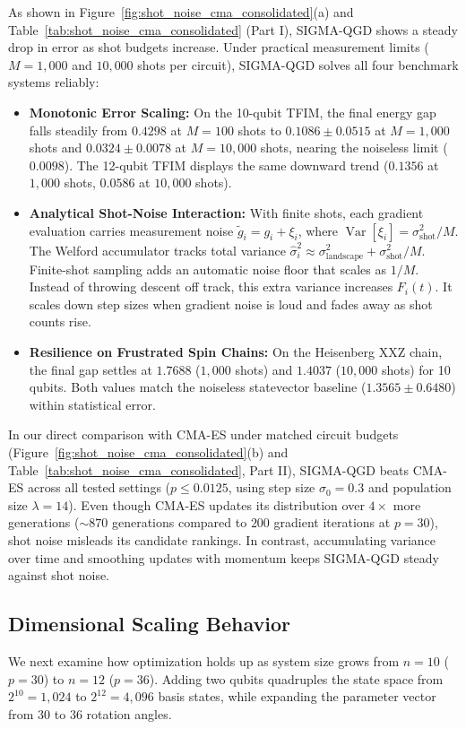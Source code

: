 \documentclass[11pt,a4paper]{article}
\begin{document}
As shown in Figure~\ref{fig:shot_noise_cma_consolidated}(a) and Table~\ref{tab:shot_noise_cma_consolidated} (Part I), SIGMA-QGD shows a steady drop in error as shot budgets increase. Under practical measurement limits ($M=1{,}000$ and $10{,}000$ shots per circuit), SIGMA-QGD solves all four benchmark systems reliably:
\begin{itemize}
    \item \textbf{Monotonic Error Scaling:} On the 10-qubit TFIM, the final energy gap falls steadily from $0.4298$ at $M=100$ shots to $0.1086 \pm 0.0515$ at $M=1{,}000$ shots and $0.0324 \pm 0.0078$ at $M=10{,}000$ shots, nearing the noiseless limit ($0.0098$). The 12-qubit TFIM displays the same downward trend ($0.1356$ at $1{,}000$ shots, $0.0586$ at $10{,}000$ shots).
    \item \textbf{Analytical Shot-Noise Interaction:} With finite shots, each gradient evaluation carries measurement noise $\tilde{g}_i = g_i + \xi_i$, where $\operatorname{Var}[\xi_i] = \sigma_{\text{shot}}^2 / M$. The Welford accumulator tracks total variance $\hat{\sigma}_i^2 \approx \sigma_{\text{landscape}}^2 + \sigma_{\text{shot}}^2 / M$. Finite-shot sampling adds an automatic noise floor that scales as $1/M$. Instead of throwing descent off track, this extra variance increases $F_i(t)$. It scales down step sizes when gradient noise is loud and fades away as shot counts rise.
    \item \textbf{Resilience on Frustrated Spin Chains:} On the Heisenberg XXZ chain, the final gap settles at $1.7688$ ($1{,}000$ shots) and $1.4037$ ($10{,}000$ shots) for 10 qubits. Both values match the noiseless statevector baseline ($1.3565 \pm 0.6480$) within statistical error.
\end{itemize}

In our direct comparison with CMA-ES under matched circuit budgets (Figure~\ref{fig:shot_noise_cma_consolidated}(b) and Table~\ref{tab:shot_noise_cma_consolidated}, Part II), SIGMA-QGD beats CMA-ES across all tested settings ($p \le 0.0125$, using step size $\sigma_0 = 0.3$ and population size $\lambda = 14$). Even though CMA-ES updates its distribution over $4\times$ more generations ($\sim 870$ generations compared to $200$ gradient iterations at $p=30$), shot noise misleads its candidate rankings. In contrast, accumulating variance over time and smoothing updates with momentum keeps SIGMA-QGD steady against shot noise.

\subsection{Dimensional Scaling Behavior}
\label{sec:scaling_results}
We next examine how optimization holds up as system size grows from $n=10$ ($p=30$) to $n=12$ ($p=36$). Adding two qubits quadruples the state space from $2^{10} = 1,024$ to $2^{12} = 4,096$ basis states, while expanding the parameter vector from $30$ to $36$ rotation angles. 
\end{document}
